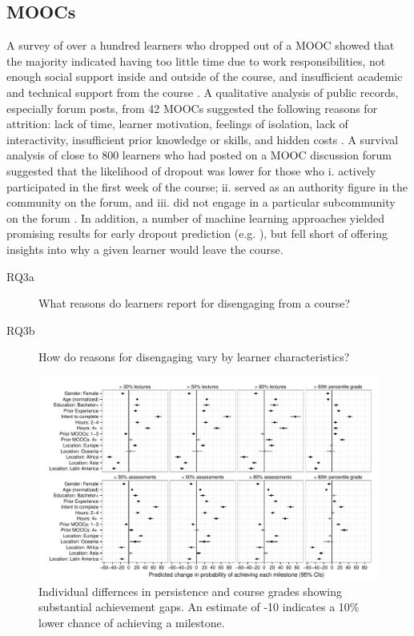 \documentclass{sigchi}\usepackage[]{graphicx}\usepackage[]{color}
\makeatletter
\def\maxwidth{ %
  \ifdim\Gin@nat@width>\linewidth
    \linewidth
  \else
    \Gin@nat@width
  \fi
}
\newenvironment{knitrout}{}{} %
\makeatother
\begin{document}
\subsection{MOOCs}

A survey of over a hundred learners who dropped out of a MOOC showed that the majority indicated having too little time due to work responsibilities, not enough social support inside and outside of the course, and insufficient academic and technical support from the course \cite{gutl2014attrition}. A qualitative analysis of public records, especially forum posts, from 42 MOOCs suggested the following reasons for attrition: lack of time, learner motivation, feelings of isolation, lack of interactivity, insufficient prior knowledge or skills, and hidden costs \cite{khalil2014moocs}. A survival analysis of close to 800 learners who had posted on a MOOC discussion forum suggested that the likelihood of dropout was lower for those who i. actively participated in the first week of the course; ii. served as an authority figure in the community on the forum, and iii. did not engage in a particular subcommunity on the forum \cite{yang2013turn}. In addition, a number of machine learning approaches yielded promising results for early dropout prediction (e.g. \cite{taylor2014likely,halawa2014dropout}), but fell short of offering insights into why a given learner would leave the course.

\begin{description}
\item[RQ3a] What reasons do learners report for disengaging from a course?
\item[RQ3b] How do reasons for disengaging vary by learner characteristics?
\end{description}  

\begin{knitrout}
\color{fgcolor}\begin{figure}[ht]

\includegraphics[width=\maxwidth]{figure/s1coefs} \caption[Individual differnces in persistence and course grades showing substantial achievement gaps]{Individual differnces in persistence and course grades showing substantial achievement gaps. An estimate of -10 indicates a 10\% lower chance of achieving a milestone.\label{fig:s1coefs}}
\end{figure}


\end{knitrout}
\end{document}
